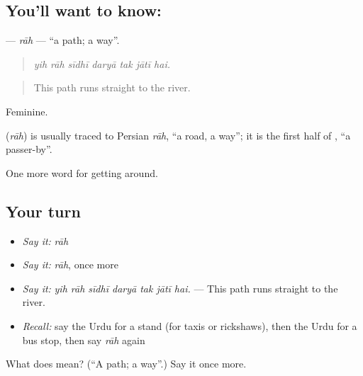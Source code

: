 \subsection*{You'll want to know: }
\textbf{} — \emph{rāh} — \textquotedblleft{}a path; a way\textquotedblright{}.

\begin{quote}
      
\end{quote}

\begin{quote}
\emph{yih rāh sīdhī daryā tak jātī hai.}
\end{quote}

\begin{quote}
This path runs straight to the river.
\end{quote}

Feminine.

\begin{cousinweb}
\textbf{} (\emph{rāh}) is usually traced to Persian \emph{rāh}, \textquotedblleft{}a road, a way\textquotedblright{}; it is the first half of \textbf{}, \textquotedblleft{}a passer-by\textquotedblright{}.
\end{cousinweb}

\begin{grammarlens}[title={What you've built}]
One more word for getting around.
\end{grammarlens}

\subsection*{Your turn}
\begin{itemize}
\raggedright
  \item \emph{Say it:} \emph{rāh}
  \item \emph{Say it:} \emph{rāh}, once more
  \item \emph{Say it:} \emph{yih rāh sīdhī daryā tak jātī hai.} — This path runs straight to the river.
  \item \emph{Recall:} say the Urdu for a stand (for taxis or rickshaws), then the Urdu for a bus stop, then say \emph{rāh} again
\end{itemize}

\begin{tcolorbox}[breakable,colback=teal!4,colframe=teal!35!black,title={Before you move on}]
What does  mean? (\textquotedblleft{}A path; a way\textquotedblright{}.) Say it once more.
\end{tcolorbox}
